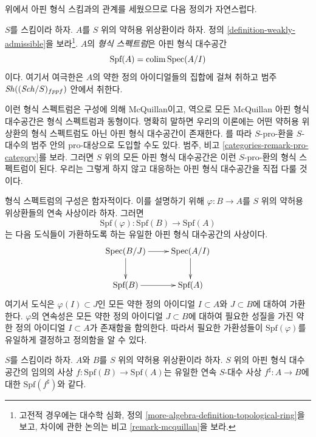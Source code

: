 \noindent
위에서 아핀 형식 스킴과의 관계를 세웠으므로 다음 정의가 자연스럽다.

\begin{definition}
\label{definition-affine-formal-spectrum}
$S$를 스킴이라 하자. $A$를 $S$ 위의 약허용 위상환이라 하자. 정의
\ref{definition-weakly-admissible}을 보라\footnote{고전적 경우에는
대수학 심화, 정의 \ref{more-algebra-definition-topological-ring}을
보고, 차이에 관한 논의는 비고 \ref{remark-mcquillan}을 보라.}.
$A$의 {\it 형식 스펙트럼}은 아핀 형식 대수공간
$$
\text{Spf}(A) = \mathop{\mathrm{colim}}\nolimits \mathop{\mathrm{Spec}}(A/I)
$$
이다. 여기서 여극한은 $A$의 약한 정의 아이디얼들의 집합에 걸쳐
취하고 범주 $\mathop{\mathit{Sh}}\nolimits((\mathit{Sch}/S)_{fppf})$ 안에서 취한다.
\end{definition}

\noindent
이런 형식 스펙트럼은 구성에 의해 McQuillan이고, 역으로 모든
McQuillan 아핀 형식 대수공간은 형식 스펙트럼과 동형이다. 명확히
말하면 우리의 이론에는 어떤 약허용 위상환의 형식 스펙트럼도 아닌
아핀 형식 대수공간이 존재한다. \cite{Yasuda}를 따라 $S$-pro-환을
$S$-대수의 범주 안의 pro-대상으로 도입할 수도 있다. 범주, 비고
\ref{categories-remark-pro-category}를 보라. 그러면 $S$ 위의 모든
아핀 형식 대수공간은 이런 $S$-pro-환의 형식 스펙트럼이 된다. 우리는
그렇게 하지 않고 대응하는 아핀 형식 대수공간을 직접 다룰 것이다.

\medskip\noindent
형식 스펙트럼의 구성은 함자적이다. 이를 설명하기 위해
$\varphi : B \to A$를 $S$ 위의 약허용 위상환들의 연속 사상이라 하자.
그러면
$$
\text{Spf}(\varphi) : \text{Spf}(B) \to \text{Spf}(A)
$$
는 다음 도식들이 가환하도록 하는 유일한 아핀 형식 대수공간의 사상이다.
$$
\xymatrix{
\Spec(B/J) \ar[d] \ar[r] & \Spec(A/I) \ar[d] \\
\text{Spf}(B) \ar[r] & \text{Spf}(A)
}
$$
여기서 도식은 $\varphi(I) \subset J$인 모든 약한 정의 아이디얼
$I \subset A$와 $J \subset B$에 대하여 가환한다. $\varphi$의 연속성은
모든 약한 정의 아이디얼 $J \subset B$에 대하여 필요한 성질을 가진
약한 정의 아이디얼 $I \subset A$가 존재함을 함의한다. 따라서 필요한
가환성들이 $\text{Spf}(\varphi)$를 유일하게 결정하고 정의함을 알 수 있다.

\begin{lemma}
\label{lemma-morphism-between-formal-spectra}
$S$를 스킴이라 하자. $A$와 $B$를 $S$ 위의 약허용 위상환이라 하자.
$S$ 위의 아핀 형식 대수공간의 임의의 사상
$f : \text{Spf}(B) \to \text{Spf}(A)$는 유일한 연속 $S$-대수 사상
$f^\sharp : A \to B$에 대한 $\text{Spf}(f^\sharp)$와 같다.
\end{lemma}

